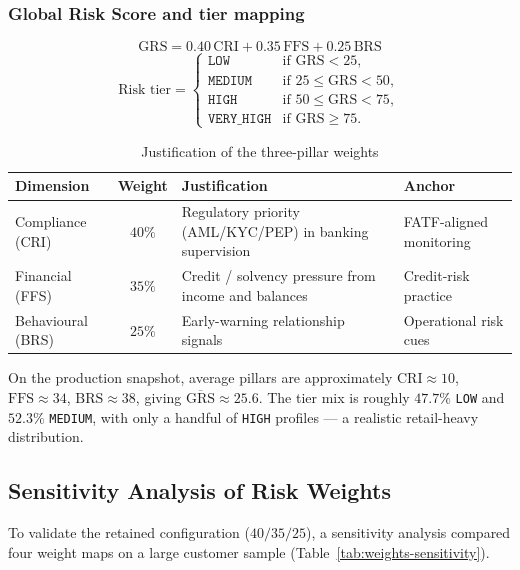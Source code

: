 \subsubsection{Global Risk Score and tier mapping}
\begin{equation}
\label{eq:grs}
\boxed{\mathrm{GRS} = 0.40\,\mathrm{CRI} + 0.35\,\mathrm{FFS} + 0.25\,\mathrm{BRS}}
\end{equation}
\begin{equation}
\label{eq:tier}
\text{Risk tier} =
\begin{cases}
\texttt{LOW} & \text{if } \mathrm{GRS} < 25,\\
\texttt{MEDIUM} & \text{if } 25 \le \mathrm{GRS} < 50,\\
\texttt{HIGH} & \text{if } 50 \le \mathrm{GRS} < 75,\\
\texttt{VERY\_HIGH} & \text{if } \mathrm{GRS} \ge 75.
\end{cases}
\end{equation}

\begin{table}[H]
\centering
\caption{Justification of the three-pillar weights}
\label{tab:scoring-weights}
\renewcommand{\arraystretch}{1.2}
\scriptsize
\begin{tabular}{|p{3.0cm}|c|p{6.5cm}|p{3.0cm}|}
\hline
\rowcolor{blue!15}
\textbf{Dimension} & \textbf{Weight} & \textbf{Justification} & \textbf{Anchor} \\
\hline
Compliance (CRI) & $40\%$ & Regulatory priority (AML/KYC/PEP) in banking supervision & FATF-aligned monitoring \\
\hline
Financial (FFS) & $35\%$ & Credit / solvency pressure from income and balances & Credit-risk practice \\
\hline
Behavioural (BRS) & $25\%$ & Early-warning relationship signals & Operational risk cues \\
\hline
\end{tabular}
\end{table}

On the production snapshot, average pillars are approximately
$\mathrm{CRI}\approx 10$, $\mathrm{FFS}\approx 34$, $\mathrm{BRS}\approx 38$, giving
$\overline{\mathrm{GRS}}\approx 25.6$. The tier mix is roughly $47.7\%$
\texttt{LOW} and $52.3\%$ \texttt{MEDIUM}, with only a handful of \texttt{HIGH}
profiles --- a realistic retail-heavy distribution.

\subsection{Sensitivity Analysis of Risk Weights}
To validate the retained configuration ($40/35/25$), a sensitivity analysis
compared four weight maps on a large customer sample
(Table~\ref{tab:weights-sensitivity}).

